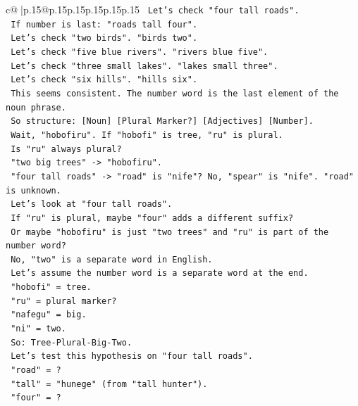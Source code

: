\documentclass{article}
\begin{document}
{\begin{supertabular}{c@{$\;$}|p{.15\linewidth}@{}p{.15\linewidth}p{.15\linewidth}p{.15\linewidth}p{.15\linewidth}p{.15\linewidth}}
{{{\texttt{        Let's check "four tall roads".} \\
\texttt{        If number is last: "roads tall four".} \\
\texttt{        Let's check "two birds". "birds two".} \\
\texttt{        Let's check "five blue rivers". "rivers blue five".} \\
\texttt{        Let's check "three small lakes". "lakes small three".} \\
\texttt{        Let's check "six hills". "hills six".} \\
\texttt{        This seems consistent. The number word is the last element of the noun phrase.} \\
\texttt{        So structure: {[}Noun{]} {[}Plural Marker?{]} {[}Adjectives{]} {[}Number{]}.} \\
\texttt{        Wait, "hobofiru". If "hobofi" is tree, "ru" is plural.} \\
\texttt{        Is "ru" always plural?} \\
\texttt{        "two big trees" {-}> "hobofiru".} \\
\texttt{        "four tall roads" {-}> "road" is "nife"? No, "spear" is "nife". "road" is unknown.} \\
\texttt{        Let's look at "four tall roads".} \\
\texttt{        If "ru" is plural, maybe "four" adds a different suffix?} \\
\texttt{        Or maybe "hobofiru" is just "two trees" and "ru" is part of the number word?} \\
\texttt{        No, "two" is a separate word in English.} \\
\texttt{        Let's assume the number word is a separate word at the end.} \\
\texttt{        "hobofi" = tree.} \\
\texttt{        "ru" = plural marker?} \\
\texttt{        "nafegu" = big.} \\
\texttt{        "ni" = two.} \\
\texttt{        So: Tree{-}Plural{-}Big{-}Two.} \\
\texttt{        Let's test this hypothesis on "four tall roads".} \\
\texttt{        "road" = ?} \\
\texttt{        "tall" = "hunege" (from "tall hunter").} \\
\texttt{        "four" = ?} \\
}}}
\end{supertabular}}
\end{document}
